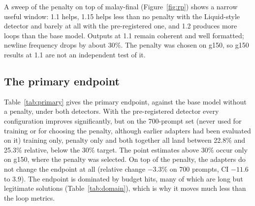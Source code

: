 \documentclass[11pt]{article}
\begin{document}
A sweep of the penalty on top of malay-final (Figure~\ref{fig:rp}) shows a narrow useful window: 1.1 helps, 1.15 helps less than no penalty with the Liquid-style detector and barely at all with the pre-registered one, and 1.2 produces more loops than the base model. Outputs at 1.1 remain coherent and well formatted; newline frequency drops by about 30\%. The penalty was chosen on g150, so g150 results at 1.1 are not an independent test of it.

\subsection{The primary endpoint}

Table~\ref{tab:primary} gives the primary endpoint, against the base model without a penalty, under both detectors. With the pre-registered detector every configuration improves significantly, but on the 700-prompt set (never used for training or for choosing the penalty, although earlier adapters had been evaluated on it) training only, penalty only and both together all land between 22.8\% and 25.3\% relative, below the 30\% target. The point estimates above 30\% occur only on g150, where the penalty was selected. On top of the penalty, the adapters do not change the endpoint at all (relative change $-3.3\%$ on 700 prompts, CI $-11.6$ to $3.9$). The endpoint is dominated by budget hits, many of which are long but legitimate solutions (Table~\ref{tab:domain}), which is why it moves much less than the loop metrics.
\end{document}
